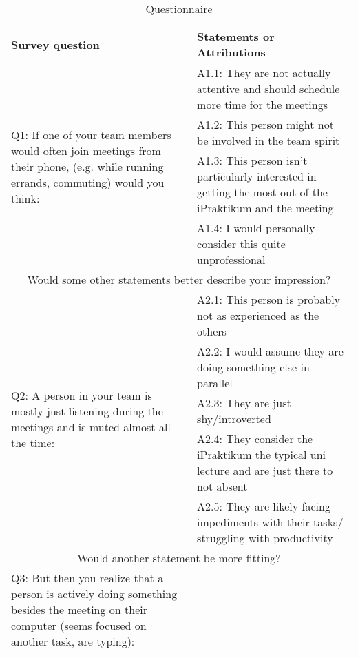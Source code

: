 \begin{longtable}{|  p{}  |  p{} |}
\caption{Questionnaire}
\label{tab:table6}\\
\hline
\textbf{Survey question} & \textbf{Statements or Attributions} \\
\hline
\multirow{4}{6cm}{Q1: If one of your team members would often join meetings from their phone, (e.g. while running errands, commuting) would you think:} & 
    \hspace{0.3cm} A1.1: They are not actually attentive and should schedule more time for the meetings  \\
    & \hspace{0.3cm} A1.2: This person might not be involved in the team spirit \\
    & \hspace{0.3cm} A1.3: This person isn't particularly interested in getting the most out of the iPraktikum and the meeting \\
    &  \hspace{0.3cm} A1.4: I would personally consider this quite unprofessional \\
\hline
\multicolumn{2}{|c|}{Would some other statements better describe your impression?} \\
\hline
\multirow{5}{6cm}{Q2: A person in your team is mostly just listening during the meetings and is muted almost all the time:} &
   \hspace{0.3cm} A2.1: This person is probably not as experienced as the others \\
    & \hspace{0.3cm} A2.2: I would assume they are doing something else in parallel\\
    & \hspace{0.3cm} A2.3: They are just shy/introverted \\
    & \hspace{0.3cm} A2.4: They consider the iPraktikum the typical uni lecture and are just there to not absent\\
   &  \hspace{0.3cm} A2.5: They are likely facing impediments with their tasks/ struggling with productivity \\
 \hline
\multicolumn{2}{|c|}{Would another statement be more fitting?} \\
\hline
\multirow{4}{6cm}{Q3: But then you realize that a person is actively doing something besides the meeting on their computer (seems focused on another task, are typing):} & 

\end{longtable}
